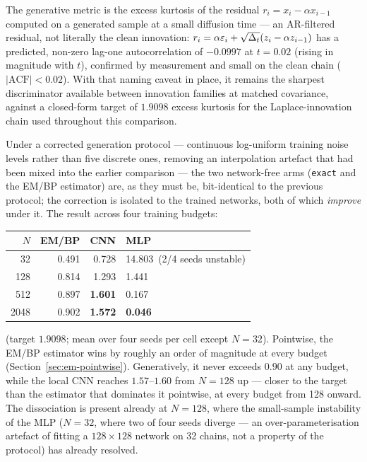 The generative metric is the excess kurtosis of the residual
$r_i = x_i - \alpha x_{i-1}$ computed on a generated sample at a small
diffusion time --- an AR-filtered residual, not literally the clean innovation:
$r_i = \alpha\varepsilon_i + \sqrt{\Delta_t}(z_i - \alpha z_{i-1})$ has a
predicted, non-zero lag-one autocorrelation of $-0.0997$ at $t=0.02$ (rising
in magnitude with $t$), confirmed by measurement and small on the clean
chain ($|\text{ACF}|<0.02$). With that naming caveat in place, it remains
the sharpest discriminator available between innovation families at matched
covariance, against a closed-form target of $1.9098$ excess kurtosis for the
Laplace-innovation chain used throughout this comparison.

Under a corrected generation protocol --- continuous log-uniform training
noise levels rather than five discrete ones, removing an interpolation
artefact that had been mixed into the earlier comparison --- the two
network-free arms (\texttt{exact} and the EM/BP estimator) are, as they must
be, bit-identical to the previous protocol; the correction is isolated to
the trained networks, both of which \emph{improve} under it. The result
across four training budgets:

\begin{center}
\begin{tabular}{@{}rrrl@{}}
\toprule
$N$ & EM/BP & CNN & MLP \\
\midrule
32   & 0.491 & 0.728 & 14.803\ (2/4 seeds unstable) \\
128  & 0.814 & 1.293 & 1.441 \\
512  & 0.897 & \textbf{1.601} & 0.167 \\
2048 & 0.902 & \textbf{1.572} & \textbf{0.046} \\
\bottomrule
\end{tabular}
\end{center}
\noindent(target $1.9098$; mean over four seeds per cell except $N=32$).
Pointwise, the EM/BP estimator wins by roughly an order of magnitude at every
budget (Section~\ref{sec:em-pointwise}). Generatively, it never exceeds
$0.90$ at any budget, while the local CNN reaches $1.57$--$1.60$ from
$N=128$ up --- closer to the target than the estimator that dominates it
pointwise, at every budget from 128 onward. The dissociation is present
already at $N=128$, where the small-sample instability of the MLP ($N=32$,
where two of four seeds diverge --- an over-parameterisation artefact of
fitting a $128\times128$ network on 32 chains, not a property of the
protocol) has already resolved.

